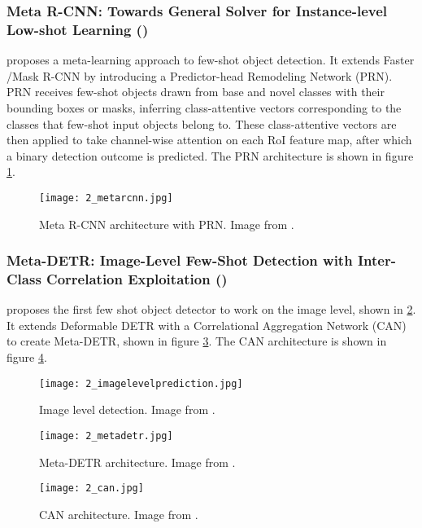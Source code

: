 \subsubsection{Meta R-CNN: Towards General Solver for Instance-level Low-shot Learning (\citet{meta-rcnn})}
\citet{meta-rcnn} proposes a meta-learning approach to few-shot object detection. It extends
Faster /Mask R-CNN\cite{maskrcnn} by introducing a Predictor-head Remodeling Network (PRN). PRN receives few-shot objects drawn from base and novel classes with their bounding boxes or masks, inferring class-attentive vectors corresponding to the classes that few-shot input objects belong to. These class-attentive vectors are then applied to take channel-wise attention on each RoI feature map, after which a binary detection outcome is predicted. The PRN architecture is shown in figure \ref{fig:2_metarcnn}.

\begin{figure}[h]
	\centering
	\texttt{[image: 2\_metarcnn.jpg]}
	\caption{\label{fig:2_metarcnn} Meta R-CNN architecture with PRN. Image from \citet{meta-rcnn}.}
\end{figure}

\subsubsection{Meta-DETR: Image-Level Few-Shot Detection with Inter-Class Correlation Exploitation (\citet{MetaDETR})}
\citet{MetaDETR} proposes the first few shot object detector to work on the image level, shown in \ref{fig:2_imagelevelprediction}. It extends Deformable DETR with a Correlational Aggregation Network (CAN) to create Meta-DETR, shown in figure \ref{fig:2_metadetr}. The CAN architecture is shown in figure \ref{fig:2_CAN}. 

\begin{figure}[h]
    \centering
    \texttt{[image: 2\_imagelevelprediction.jpg]}
    \caption{\label{fig:2_imagelevelprediction} Image level detection. Image from \citet{MetaDETR}.}
\end{figure}

\begin{figure}[h]
    \centering
    \texttt{[image: 2\_metadetr.jpg]}
    \caption{\label{fig:2_metadetr} Meta-DETR architecture. Image from \citet{MetaDETR}.}
\end{figure}

\begin{figure}[h]
    \centering
    \texttt{[image: 2\_can.jpg]}
    \caption{\label{fig:2_CAN} CAN architecture. Image from \citet{MetaDETR}.}
\end{figure}

